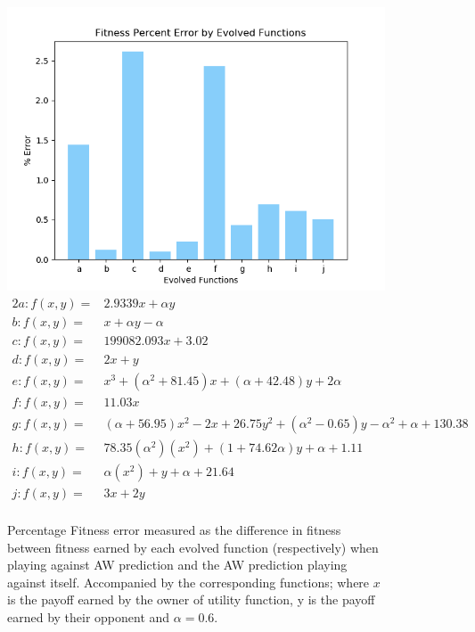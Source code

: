 \documentclass[11pt]{book}
\begin{document}
\begin{figure}
	\centering
	\includegraphics[scale=0.7]{resources/symmetric_percenterror_barchart_fitness_earned_against_target_r_06.png}
	\begin{alignat*}{2}
		a: f(x, y) = & 2.9339x + \alpha y&\\
		b: f(x, y) = & x + \alpha y -\alpha &\\
		c: f(x, y) = & 199082.093x + 3.02&\\
		d: f(x, y) = & 2x + y&\\
		e: f(x, y) = & x^3 + (\alpha^2 + 81.45)x + (\alpha+42.48)y + 2\alpha &\\
		f: f(x, y) = & 11.03x&\\
		g: f(x, y) = & (\alpha + 56.95)x^2 - 2x + 26.75y^2  + (\alpha^2 - 0.65)y  - \alpha^2 + \alpha + 130.38&\\
		h: f(x, y) = & 78.35(\alpha^2)(x^2) + (1 +74.62\alpha )y + \alpha + 1.11&\\
		i: f(x, y) = & \alpha (x^2) + y + \alpha + 21.64&\\
		j: f(x, y) = & 3x + 2y&\\
	\end{alignat*}
	\caption{Percentage Fitness error measured as the difference in fitness between fitness earned by each evolved function (respectively) when playing against AW prediction and the AW prediction playing against itself. Accompanied by the corresponding functions; where $x$ is the payoff earned by the owner of utility function, y is the payoff earned by their opponent and $\alpha = 0.6$.}
	\label{barchart_fitness_earned_against_target_r06}
\end{figure}
\end{document}
